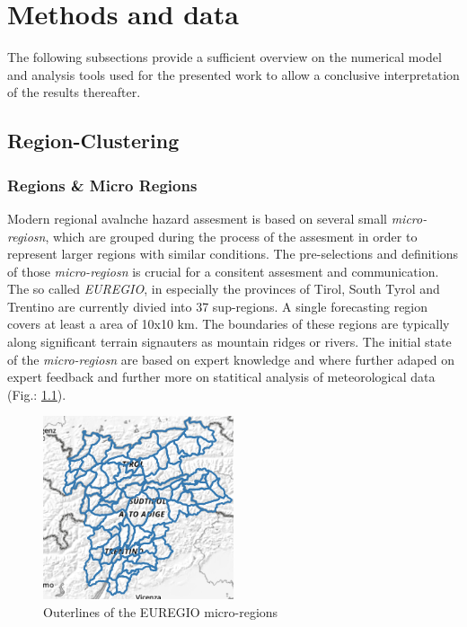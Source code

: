 \chapter{Methods and data}

The following subsections provide a sufficient overview on the numerical model and analysis tools used for the presented work to allow a conclusive interpretation of the results thereafter.

\section{Region-Clustering} 
\label{sec:region_clustering}

\subsection{Regions \& Micro Regions}

Modern regional avalnche hazard assesment is based on several small \textit{micro-regiosn}, 
which are grouped during the process of the assesment in order to represent larger regions with similar conditions.
The pre-selections and definitions of those \textit{micro-regiosn} is crucial for a consitent assesment and
communication. The so called \textit{EUREGIO}, in especially the provinces of Tirol, South Tyrol and Trentino are 
currently divied into 37 sup-regions. A single forecasting region covers at least a area of 10x10 km.
The boundaries of these regions are typically along significant terrain signauters as mountain ridges or rivers.
The initial state of the \textit{micro-regiosn} are based on expert knowledge and where further adaped on 
expert feedback and further more on statitical analysis of meteorological data (Fig.: \ref{fig:EAWS_regions}).

\begin{figure}[h]
    \centering
    \includegraphics[width=0.5\textwidth]{Figures/figures_methods/micro_regions_EAWS.png}
    \caption{Outerlines of the EUREGIO micro-regions}
    \label{fig:EAWS_regions}
\end{figure}

